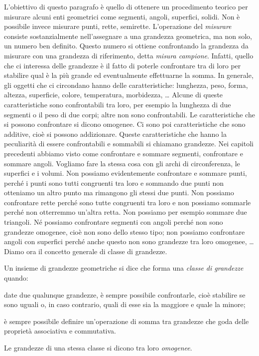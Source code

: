 L'obiettivo di questo paragrafo è quello di ottenere un procedimento teorico per misurare alcuni enti geometrici come segmenti, angoli, superfici, solidi. Non è possibile invece misurare punti, rette, semirette.
L'operazione del \emph{misurare} consiste sostanzialmente nell'assegnare a una grandezza geometrica, ma non solo, un numero ben definito. Questo numero si ottiene confrontando la grandezza da misurare con una grandezza di riferimento, detta \emph{misura campione}. Infatti, quello che ci interessa delle grandezze è il fatto di poterle confrontare tra di loro per stabilire qual è la più grande ed eventualmente effettuarne la somma.
In generale, gli oggetti che ci circondano hanno delle caratteristiche: lunghezza, peso, forma, altezza, superficie, colore, temperatura, morbidezza, \ldots{} Alcune di queste caratteristiche sono confrontabili tra loro, per esempio la lunghezza di due segmenti o il peso di due corpi; altre non sono confrontabili. Le caratteristiche che si possono confrontare si dicono omogenee. Ci sono poi caratteristiche che sono additive, cioè si possono addizionare. Queste caratteristiche che hanno la peculiarità di essere confrontabili e sommabili si chiamano grandezze.
Nei capitoli precedenti abbiamo visto come confrontare e sommare segmenti, confrontare e sommare angoli. Vogliamo fare la stessa cosa con gli archi di circonferenza, le superfici e i volumi.
Non possiamo evidentemente confrontare e sommare punti, perché i punti sono tutti congruenti tra loro e sommando due punti non otteniamo un altro punto ma rimangono gli stessi due punti. Non possiamo confrontare rette perché sono tutte congruenti tra loro e non possiamo sommarle perché non otterremmo un'altra retta. Non possiamo per esempio sommare due triangoli. Né possiamo confrontare segmenti con angoli perché non sono grandezze omogenee, cioè non sono dello stesso tipo; non possiamo confrontare angoli con superfici perché anche questo non sono grandezze tra loro omogenee, \ldots{}
Diamo ora il concetto generale di classe di grandezze.
\begin{definizione}
Un insieme di grandezze geometriche si dice che forma una \emph{classe di grandezze} quando:
\begin{itemize*}
\item date due qualunque grandezze, è sempre possibile confrontarle, cioè stabilire se sono uguali o, in caso contrario, quali di esse sia la maggiore e quale la minore;
\item è sempre possibile definire un'operazione di somma tra grandezze che goda delle proprietà associativa e commutativa.
\end{itemize*}
Le grandezze di una stessa classe si dicono tra loro \emph{omogenee}.
\end{definizione}

